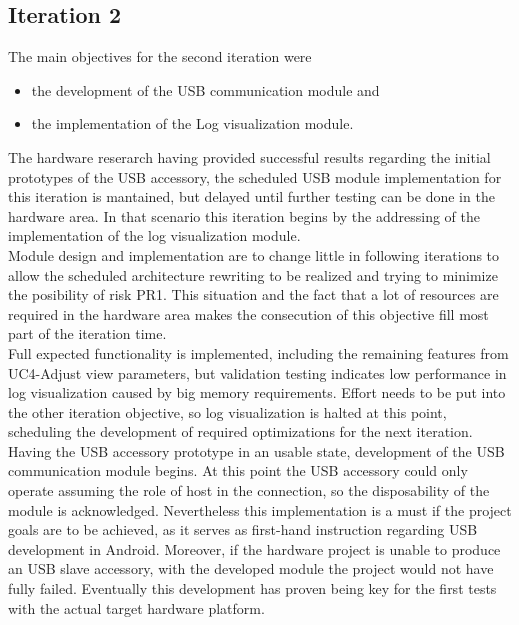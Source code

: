 			
		\subsection{Iteration 2}

			The main objectives for the second iteration were
			\begin{itemize} 
				\item the development of the USB communication module and
				\item the implementation of the Log visualization module.
			\end{itemize}

			The hardware reserarch having provided successful results regarding the initial prototypes of the USB accessory, the scheduled USB module implementation for this iteration is mantained, but delayed until further testing can be done in the hardware area. In that scenario this iteration begins by the addressing of the implementation of the log visualization module.\\

			Module design and implementation are to change little in following iterations to allow the scheduled architecture rewriting to be realized and trying to minimize the posibility of risk PR1. This situation and the fact that a lot of resources are required in the hardware area makes the consecution of this objective fill most part of the iteration time.\\

			Full expected functionality is implemented, including the remaining features from UC4-Adjust view parameters, but validation testing indicates low performance in log visualization caused by big memory requirements. Effort needs to be put into the other iteration objective, so log visualization is halted at this point, scheduling the development of required optimizations for the next iteration.\\

			Having the USB accessory prototype in an usable state, development of the USB communication module begins. At this point the USB accessory could only operate assuming the role of host in the connection, so the disposability of the module is acknowledged. Nevertheless this implementation is a must if the project goals are to be achieved, as it serves as first-hand instruction regarding USB development in Android. Moreover, if the hardware project is unable to produce an USB slave accessory, with the developed module the project would not have fully failed. Eventually this development has proven being key for the first tests with the actual target hardware platform.\\

